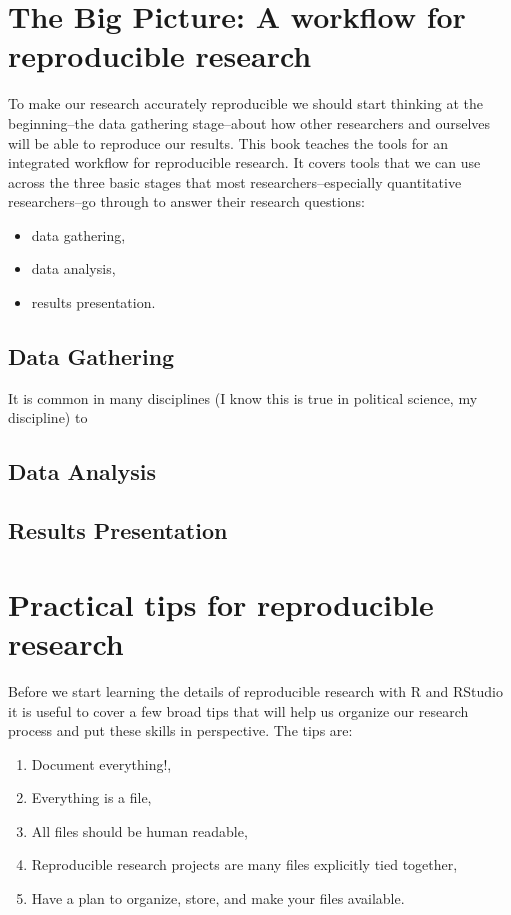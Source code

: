 \documentclass[ChapterTOCs,krantz1]{krantz}\usepackage{graphicx, color}
\begin{document}
\section{The Big Picture: A workflow for reproducible research}

To make our research accurately reproducible we should start thinking at the beginning--the data gathering stage--about how other researchers and ourselves will be able to reproduce our results. This book teaches the tools for an integrated workflow for reproducible research. It covers tools that we can use across the three basic stages that most researchers--especially quantitative researchers--go through to answer their research questions:

\begin{itemize}
    \item data gathering,
    \item data analysis,
    \item results presentation.
\end{itemize}

\subsection{Data Gathering}

It is common in many disciplines (I know this is true in political science, my discipline) to 

\subsection{Data Analysis}

\subsection{Results Presentation}

\section{Practical tips for reproducible research}

Before we start learning the details of reproducible research with R and RStudio it is useful to cover a few broad tips that will help us organize our research process and put these skills in perspective. The tips are:

\begin{enumerate}
    \item Document everything!,
    \item Everything is a file,
    \item All files should be human readable,
    \item Reproducible research projects are many files explicitly tied together,
    \item Have a plan to organize, store, and make your files available.
    
\end{enumerate}
\end{document}
